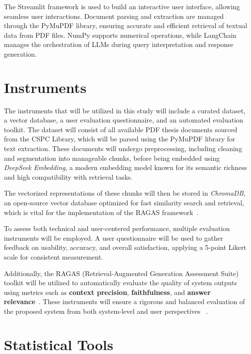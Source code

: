 \begin{refsection}
The Streamlit framework is used to build an interactive user interface, allowing seamless user interactions. Document parsing and extraction are managed through the PyMuPDF library, ensuring accurate and efficient retrieval of textual data from PDF files. NumPy supports numerical operations, while LangChain manages the orchestration of LLMs during query interpretation and response generation.

\section{Instruments}

The instruments that will be utilized in this study will include a curated dataset, a vector database, a user evaluation questionnaire, and an automated evaluation toolkit. The dataset will consist of all available PDF thesis documents sourced from the CSPC Library, which will be parsed using the PyMuPDF library for text extraction. These documents will undergo preprocessing, including cleaning and segmentation into manageable chunks, before being embedded using \textit{DeepSeek Embedding}, a modern embedding model known for its semantic richness and high compatibility with retrieval tasks.

The vectorized representations of these chunks will then be stored in \textit{ChromaDB}, an open-source vector database optimized for fast similarity search and retrieval, which is vital for the implementation of the RAGAS framework~\cite{trychroma2023chroma}.

To assess both technical and user-centered performance, multiple evaluation instruments will be employed. A user questionnaire will be used to gather feedback on usability, accuracy, and overall satisfaction, applying a 5-point Likert scale for consistent measurement.

Additionally, the RAGAS (Retrieval-Augmented Generation Assessment Suite) toolkit will be utilized to automatically evaluate the quality of system outputs using metrics such as \textbf{context precision}, \textbf{faithfulness}, and \textbf{answer relevance}~\cite{shinn2023ragas}. These instruments will ensure a rigorous and balanced evaluation of the proposed system from both system-level and user perspectives~ \cite{lin2021bert}.

\section{Statistical Tools}


\end{refsection}
